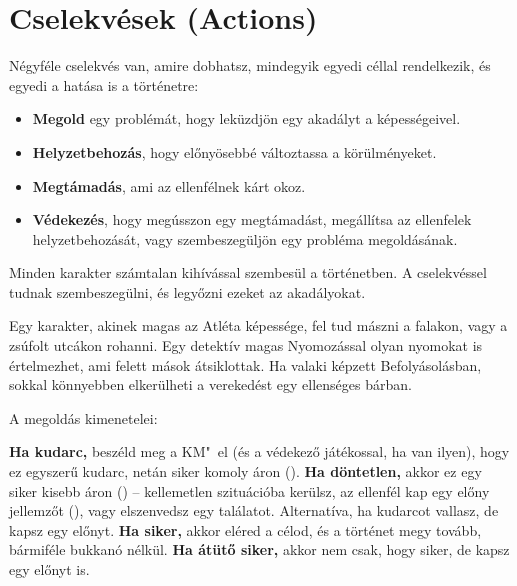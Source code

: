 \label{Cselekvések}
\section[Cselekvések]{Cselekvések (Actions)}

Négyféle cselekvés van, amire dobhatsz, mindegyik egyedi céllal rendelkezik, és egyedi a hatása is a történetre:

\begin{itemize}
    \item \textbf{Megold} egy problémát, hogy leküzdjön egy akadályt a képességeivel.
    \item \textbf{Helyzetbehozás}, hogy előnyösebbé változtassa a körülményeket.
    \item \textbf{Megtámadás}, ami az ellenfélnek kárt okoz.
    \item \textbf{Védekezés}, hogy megússzon egy megtámadást, megállítsa az ellenfelek helyzetbehozását, vagy szembeszegüljön egy probléma megoldásának.
\end{itemize}

\label{Megoldás}

Minden karakter számtalan kihívással szembesül a történetben. A  cselekvéssel tudnak szembeszegülni, és legyőzni ezeket az akadályokat.

Egy karakter, akinek magas az Atléta képessége, fel tud mászni a falakon, vagy a zsúfolt utcákon rohanni. Egy detektív magas Nyomozással olyan nyomokat is értelmezhet, ami felett mások átsiklottak. Ha valaki képzett Befolyásolásban, sokkal könnyebben elkerülheti a verekedést egy ellenséges bárban.

A megoldás kimenetelei:

\begin{itemize}
    \failureitem \textbf{Ha kudarc,} beszéld meg a KM"~el (és a védekező játékossal, ha van ilyen), hogy ez egyszerű kudarc, netán siker komoly áron ().
    \tieitem \textbf{Ha döntetlen,} akkor ez egy siker kisebb áron () -- kellemetlen szituációba kerülsz, az ellenfél kap egy előny jellemzőt (), vagy elszenvedsz egy találatot. Alternatíva, ha kudarcot vallasz, de kapsz egy előnyt.
    \successitem \textbf{Ha siker,} akkor eléred a célod, és a történet megy tovább, bármiféle bukkanó nélkül.
    \successwithstyleitem \textbf{Ha átütő siker,} akkor nem csak, hogy siker, de kapsz egy előnyt is.
\end{itemize}

